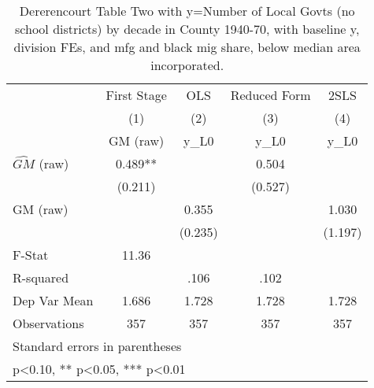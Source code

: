 \begin{table}[htbp]\centering
\def\sym#1{\ifmmode^{#1}\else\(^{#1}\)\fi}
\caption{Dererencourt Table Two with y=Number of Local Govts (no school districts) by decade in County 1940-70, with baseline y, division FEs, and mfg and black mig share, below median area incorporated.}
\begin{tabular}{l*{4}{c}}
\toprule
                    & First Stage   &         OLS   &Reduced Form   &        2SLS   \\
                    &\multicolumn{1}{c}{(1)}&\multicolumn{1}{c}{(2)}&\multicolumn{1}{c}{(3)}&\multicolumn{1}{c}{(4)}\\
                    &\multicolumn{1}{c}{GM  (raw)}&\multicolumn{1}{c}{y\_L0}&\multicolumn{1}{c}{y\_L0}&\multicolumn{1}{c}{y\_L0}\\
\midrule
$\hat{GM}$ (raw)    &       0.489** &               &       0.504   &               \\
                    &     (0.211)   &               &     (0.527)   &               \\
\addlinespace
GM  (raw)           &               &       0.355   &               &       1.030   \\
                    &               &     (0.235)   &               &     (1.197)   \\
\midrule
F-Stat              &       11.36   &               &               &               \\
R-squared           &               &        .106   &        .102   &               \\
Dep Var Mean        &       1.686   &       1.728   &       1.728   &       1.728   \\
Observations        &         357   &         357   &         357   &         357   \\
\bottomrule
\multicolumn{5}{l}{\footnotesize Standard errors in parentheses}\\
\multicolumn{5}{l}{\footnotesize * p<0.10, ** p<0.05, *** p<0.01}\\
\end{tabular}
\end{table}
